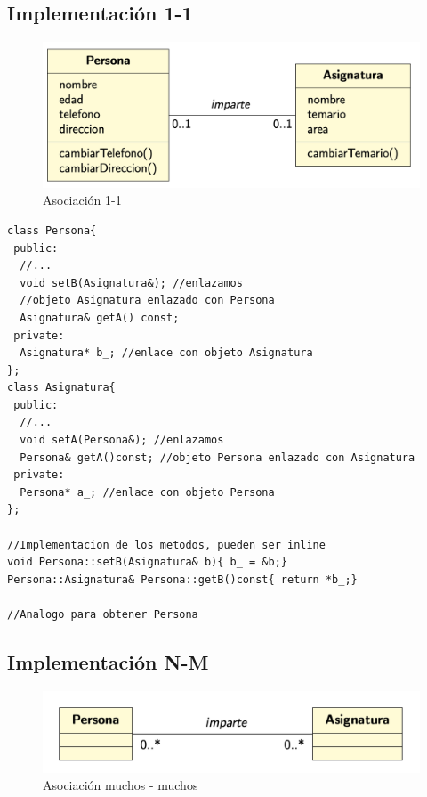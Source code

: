 \subsection{Implementación 1-1}

\begin{figure}[h]
    \centering
	\includegraphics[width=\textwidth]{Imagenes/asociacion1.png}
    \caption{Asociación 1-1}
\end{figure}
\begin{center}
	\begin{lstlisting}[frame=single]
class Persona{
 public:
  //...
  void setB(Asignatura&); //enlazamos   
  //objeto Asignatura enlazado con Persona
  Asignatura& getA() const; 
 private:
  Asignatura* b_; //enlace con objeto Asignatura
};
class Asignatura{
 public:
  //...
  void setA(Persona&); //enlazamos
  Persona& getA()const; //objeto Persona enlazado con Asignatura
 private:
  Persona* a_; //enlace con objeto Persona
};

//Implementacion de los metodos, pueden ser inline
void Persona::setB(Asignatura& b){ b_ = &b;}
Persona::Asignatura& Persona::getB()const{ return *b_;}

//Analogo para obtener Persona
\end{lstlisting}
\end{center}


\newpage
\subsection{Implementación N-M}
\begin{figure}[h]
    \centering
    \includegraphics[width=\textwidth]{Imagenes/asociacion2.png}
    \caption{Asociación muchos - muchos}
\end{figure}

